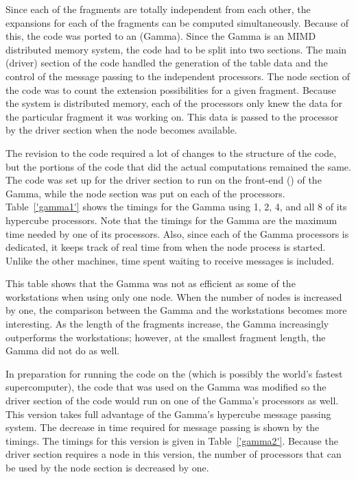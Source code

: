 Since each of the fragments are totally independent from each other, the
expansions for each of the fragments can be computed simultaneously.  Because
of this, the code was ported to an \gamma (Gamma).  Since the Gamma is an MIMD
distributed memory system, the code had to be split into two sections.  The
main (driver) section of the code handled the generation of the table data
and the control of the message passing to the independent processors.  The
node section of the code was to count the extension possibilities for a
given fragment.  Because the system is distributed memory, each of the
processors only knew the data for the particular fragment it was working
on.  This data is passed to the processor by the driver section when the
node becomes available.

The revision to the code required a lot of changes to the structure of the
code, but the portions of the code that did the actual computations remained
the same.  The code was set up for the driver section to run on the front-end
(\intel) of the Gamma, while the node section was put on each of the
processors.  Table~\ref{'gamma1'} shows the timings for the Gamma using 1, 2,
4, and all 8 of its hypercube processors.  Note that the timings for the
Gamma are the maximum time needed by one of its processors.  Also, since
each of the Gamma processors is dedicated, it keeps track of real time from
when the node process is started.  Unlike the other machines, time spent
waiting to receive messages is included.



This table shows that the Gamma was not as efficient as some of the workstations
when using only one node.  When the number of nodes is increased by one,
the comparison between the Gamma and the workstations becomes more
interesting.  As the length of the fragments increase, the Gamma
increasingly outperforms the workstations; however, at the smallest
fragment length, the Gamma did not do as well.

In preparation for running the code on the \delta (which is possibly the
world's fastest supercomputer), the code that was used on the Gamma was
modified so the driver section of the code would run on one of the Gamma's
processors as well.  This version takes full advantage of the Gamma's
hypercube message passing system.  The decrease in time required for
message passing is shown by the timings.  The timings for this version is 
given in Table~\ref{'gamma2'}.  Because the
driver section requires a node in this version, the number of processors
that can be used by the node section is decreased by one.

